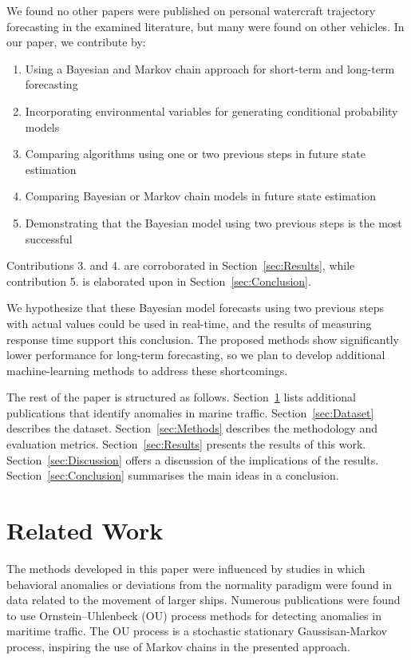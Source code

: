 \documentclass[preprint,12pt]{elsarticle}
\begin{document}
We found no other papers were published on personal watercraft trajectory forecasting in the examined literature, but many were found on other vehicles. In our paper, we contribute by:

\begin{enumerate}
    \item Using a Bayesian and Markov chain approach for short-term and long-term forecasting
    \item Incorporating environmental variables for generating conditional probability models
    \item Comparing algorithms using one or two previous steps in future state estimation
    \item Comparing Bayesian or Markov chain models in future state estimation
    \item Demonstrating that the Bayesian model using two previous steps is the most successful
\end{enumerate}

Contributions 3. and 4. are corroborated in Section~\ref{sec:Results}, while contribution 5. is elaborated upon in Section~\ref{sec:Conclusion}.

We hypothesize that these Bayesian model forecasts using two previous steps with actual values could be used in real-time, and the results of measuring response time support this conclusion. The proposed methods show significantly lower performance for long-term forecasting, so we plan to develop additional machine-learning methods to address these shortcomings.

The rest of the paper is structured as follows. Section~\ref{sec:Related} lists additional publications that identify anomalies in marine traffic. Section~\ref{sec:Dataset} describes the dataset. Section~\ref{sec:Methods} describes the methodology and evaluation metrics. Section~\ref{sec:Results} presents the results of this work. Section~\ref{sec:Discussion} offers a discussion of the implications of the results. Section~\ref{sec:Conclusion} summarises the main ideas in a conclusion.

\section{Related Work}
\label{sec:Related}

The methods developed in this paper were influenced by studies in which behavioral anomalies or deviations from the normality paradigm were found in data related to the movement of larger ships. Numerous publications \citep{2016Coraluppi, 2018dAfflisio1, 2018Coscia, 2018Coscia1, 2018Forti, 2019Forti, 2020Forti, 2022Forti2, 2016Millefiori, 2021dAfflisio, 2021dAfflisio1} were found to use Ornstein–Uhlenbeck (OU) process methods for detecting anomalies in maritime traffic. The OU process is a stochastic stationary Gaussisan-Markov process, inspiring the use of Markov chains in the presented approach.
\end{document}
